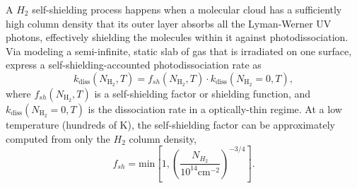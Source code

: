 \documentclass[linenumbers, twocolumn]{aastex631}
\begin{document}
A $H_{2}$ self-shielding process happens when a molecular cloud has a sufficiently high column density that its outer layer absorbs all the Lyman-Werner UV photons, effectively shielding the molecules within it against photodissociation. Via modeling a semi-infinite, static slab of gas that is irradiated on one surface, \cite{Draine+1996} express a self-shielding-accounted photodissociation rate as
\begin{equation}
    k_{\text{diss}}(N_{\text{H}_{2}},T) = f_{sh}(N_{\text{H}_{2}},T)\cdot k_{\text{diss}}(N_{\text{H}_{2}}=0,T),
\end{equation}
where $f_{sh}(N_{\text{H}_{2}},T)$ is a self-shielding factor or shielding function, and $k_{\text{diss}}(N_{\text{H}_{2}}=0,T)$ is the dissociation rate in a optically-thin regime. At a low temperature (hundreds of K), the self-shielding factor can be approximately computed from only the $H_{2}$ column density, 
\begin{equation}
    f_{sh} = \text{min}\left[1, \left( \frac{N_{H_{2}}}{10^{14}\text{cm}^{-2}}     \right)^{-3/4} \right].
\label{eq:self_shielding_factor_eq}
\end{equation}
\end{document}
